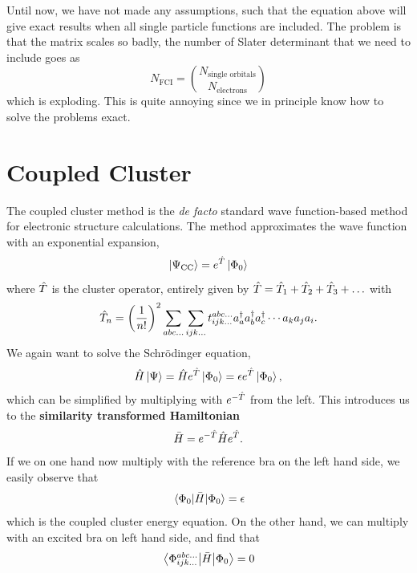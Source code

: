 Until now, we have not made any assumptions, such that the equation above will give exact results when all single particle functions are included. The problem is that the matrix scales so badly, the number of Slater determinant that we need to include goes as 
\begin{equation}
N_{\text{FCI}}=\binom{N_{\text{single orbitals}}}{N_{\text{electrons}}}
\end{equation}
which is exploding. This is quite annoying since we in principle know how to solve the problems exact.

\section{Coupled Cluster} \label{subsec:cc}
The coupled cluster method is the \textit{de facto} standard wave function-based method for electronic structure calculations. \cite{paldus_beginnings_2005} The method approximates the wave function with an exponential expansion, 
\begin{equation}
\ket{\Psi_{\text{CC}}}=e^{\hat{T}}\ket{\Phi_0}
\end{equation}
where $\hat{T}$ is the cluster operator, entirely given by $\hat{T}=\hat{T}_1+\hat{T}_2 +\hat{T}_3+\hdots$ with
\begin{equation}
\hat{T}_n = \left( \frac{1}{n!}\right)^2 \sum_{abc...} \sum_{ijk...} t_{ijk...}^{abc...}a_a^\dagger a_b^\dagger a_c^\dagger \cdots a_k a_j a_i.
\end{equation}
We again want to solve the Schrödinger equation,
\begin{equation}
\hat{H}\ket{\Psi}=\hat{H}e^{\hatT}\ket{\Phi_0}=\epsilon e^{\hatT}\ket{\Phi_0},
\end{equation}
which can be simplified by multiplying with $e^{-\hat{T}}$ from the left. This introduces us to the \textbf{similarity transformed Hamiltonian} 
\begin{equation}
\bar{H}=e^{-\hat{T}}\hat{H}e^{\hat{T}}.
\end{equation}
If we on one hand now multiply with the reference bra on the left hand side, we easily observe that
\begin{equation}
\mel{\Phi_0}{\bar{H}}{\Phi_0}=\epsilon
\end{equation}
which is the coupled cluster energy equation. On the other hand, we can multiply with an excited bra on left hand side, and find that
\begin{equation}
\mel{\Phi_{ijk\hdots}^{abc\hdots}}{\bar{H}}{\Phi_0}=0
\end{equation}
